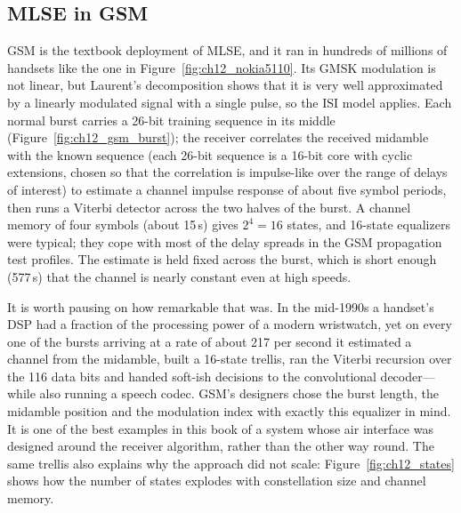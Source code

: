 
\subsection{MLSE in GSM}

GSM is the textbook deployment of MLSE, and it ran in hundreds of millions of handsets like the one
in Figure~\ref{fig:ch12_nokia5110}. Its GMSK modulation is not linear, but Laurent's decomposition
shows that it is very well approximated by a linearly modulated signal with a single pulse, so the
ISI model applies. Each normal burst carries a 26-bit training sequence in its middle
(Figure~\ref{fig:ch12_gsm_burst}); the receiver correlates the received midamble with the known
sequence (each 26-bit sequence is a 16-bit core with cyclic extensions, chosen so that the
correlation is impulse-like over the range of delays of interest) to estimate a channel impulse
response of about five symbol periods, then runs a Viterbi detector across the two halves of the
burst. A channel memory of four symbols (about 15\,\textmu s) gives $2^4=16$ states, and 16-state
equalizers were typical; they cope with most of the delay spreads in the GSM propagation test
profiles. The estimate is held fixed across the burst, which is short enough (577\,\textmu s) that the
channel is nearly constant even at high speeds.

It is worth pausing on how remarkable that was. In the mid-1990s a handset's DSP had a fraction of
the processing power of a modern wristwatch, yet on every one of the bursts arriving at a rate of
about 217 per second it estimated a channel from the midamble, built a 16-state trellis, ran the
Viterbi recursion over the 116 data bits and handed soft-ish decisions to the convolutional
decoder---while also running a speech codec. GSM's designers chose the burst length, the midamble
position and the modulation index with exactly this equalizer in mind. It is one of the best
examples in this book of a system whose air interface was designed around the receiver
algorithm, rather than the other way round. The same trellis also explains why the approach did not
scale: Figure~\ref{fig:ch12_states} shows how the number of states explodes with constellation size
and channel memory.

